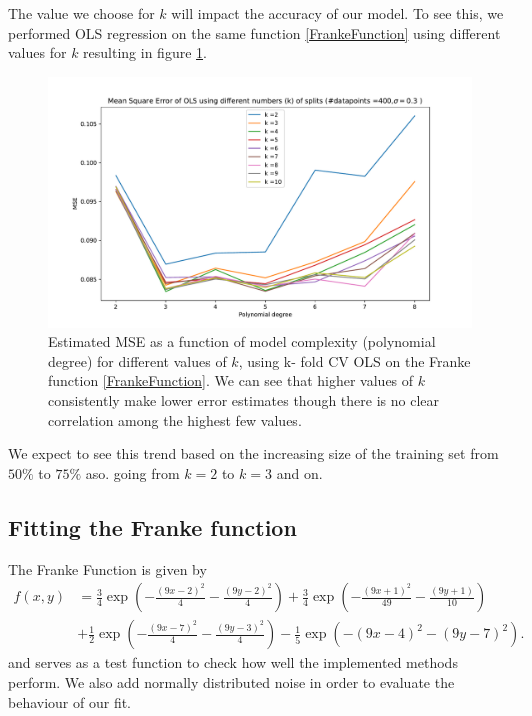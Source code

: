 \documentclass[11pt,a4paper,titlepage]{article}
\begin{document}
The value we choose for $k$ will impact the accuracy of our model. To see this, we performed OLS regression on the same function \eqref{FrankeFunction} using different values for $k$ resulting in figure \ref{bestKOLS}.
\begin{figure}[H]
\centering

\includegraphics[trim=1.4cm 0.2cm 2.5cm 1.2cm, clip=true,scale = 0.6]{MSE_OLS_k_comparison_2to10.pdf}
\caption[Estimated MSE from OLS using different number of splits in k-fold CV]{Estimated MSE as a function of model complexity (polynomial degree) for different values of $k$, using k- fold CV OLS on the Franke function \eqref{FrankeFunction}. We can see that higher values of $k$ consistently make lower error estimates though there is no clear correlation among the highest few values.}\label{bestKOLS}
\end{figure}
We expect to see this trend based on the increasing size of the training set from $50\%$ to $75\%$ aso. going from $k=2$ to $k=3$ and on.
\subsection{Fitting the Franke function}
The Franke Function is given by
\begin{align}\label{FrankeFunction}
f(x,y) &= \frac{3}{4}\exp{\left(-\frac{(9x-2)^2}{4} - \frac{(9y-2)^2}{4}\right)}+\frac{3}{4}\exp{\left(-\frac{(9x+1)^2}{49}- \frac{(9y+1)}{10}\right)}\nonumber \\
&+\frac{1}{2}\exp{\left(-\frac{(9x-7)^2}{4} - \frac{(9y-3)^2}{4}\right)} -\frac{1}{5}\exp{\left(-(9x-4)^2 - (9y-7)^2\right) }.
\end{align}
and serves as a test function to check how well the implemented methods perform. We also add normally distributed noise in order to evaluate the behaviour of our fit.
\end{document}
